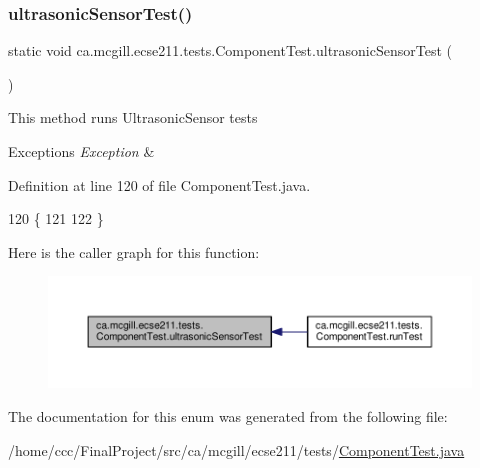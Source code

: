 \subsubsection{\texorpdfstring{ultrasonic\+Sensor\+Test()}{ultrasonicSensorTest()}}
{\footnotesize\ttfamily static void ca.\+mcgill.\+ecse211.\+tests.\+Component\+Test.\+ultrasonic\+Sensor\+Test (\begin{DoxyParamCaption}{ }\end{DoxyParamCaption})\hspace{0.3cm}{\ttfamily [static]}}

This method runs Ultrasonic\+Sensor tests


\begin{DoxyExceptions}{Exceptions}
{\em Exception} & \\
\hline
\end{DoxyExceptions}


Definition at line 120 of file Component\+Test.\+java.


\begin{DoxyCode}
120                                             \{
121 
122   \}
\end{DoxyCode}
Here is the caller graph for this function\+:\nopagebreak
\begin{figure}[H]
\begin{center}
\leavevmode
\includegraphics[width=350pt]{enumca_1_1mcgill_1_1ecse211_1_1tests_1_1_component_test_a05cd9d95458b11ed57ca001a28fffa7c_icgraph}
\end{center}
\end{figure}


The documentation for this enum was generated from the following file\+:\begin{DoxyCompactItemize}
\item 
/home/ccc/\+Final\+Project/src/ca/mcgill/ecse211/tests/\hyperlink{_component_test_8java}{Component\+Test.\+java}\end{DoxyCompactItemize}
